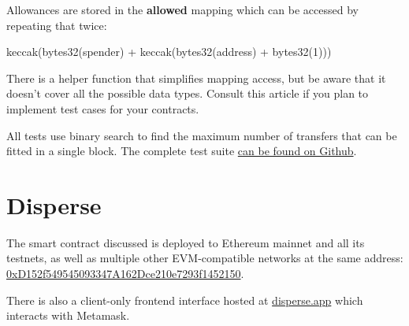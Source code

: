 \documentclass[12pt]{article}
\begin{document}
Allowances are stored in the \textbf{allowed} mapping which can be accessed by repeating that twice:
\begin{center}
keccak(bytes32(spender) + keccak(bytes32(address) + bytes32(1)))	
\end{center}

There is a helper function that simplifies mapping access, but be aware that it doesn't cover all the possible data types.
Consult this article\cite{read-storage} if you plan to implement test cases for your contracts.

All tests use binary search to find the maximum number of transfers that can be fitted in a single block.
The complete test suite \href{https://github.com/banteg/disperse-reseach}{can be found on Github}.

\section{Disperse}

The smart contract discussed is deployed to Ethereum mainnet and all its testnets, as well as multiple other EVM-compatible networks at the same address: \href{https://etherscan.io/address/0xD152f549545093347A162Dce210e7293f1452150}{0xD152f549545093347A162Dce210e7293f1452150}.

There is also a client-only frontend interface hosted at \href{https://disperse.app/}{disperse.app} which interacts with Metamask.
\end{document}

